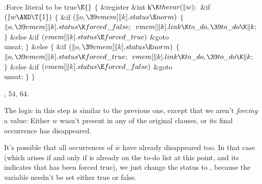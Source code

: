 \Y\B\4:Force literal  to be true\X${}\E{}$\6
${}\{{}$\1\6
\&{register} \&{int} \|k${}\K\\{thevar}(\|w);{}$\7
\&{if} ${}(\|w\AND\T{1}){}$\5
${}\{{}$\1\6
\&{if} ${}(\|o,\39\\{vmem}[\|k].\\{status}\E\\{norm}){}$\5
${}\{{}$\1\6
${}\|o,\39\\{vmem}[\|k].\\{status}\K\\{forced\_false};{}$\6
${}\\{vmem}[\|k].\\{link}\K\\{to\_do},\39\\{to\_do}\K\|k;{}$\6
\4${}\}{}$\5
\2\&{else} \&{if} ${}(\\{vmem}[\|k].\\{status}\E\\{forced\_true}){}$\1\5
\&{goto} \\{unsat};\2\6
\4${}\}{}$\5
\2\&{else}\5
${}\{{}$\1\6
\&{if} ${}(\|o,\39\\{vmem}[\|k].\\{status}\E\\{norm}){}$\5
${}\{{}$\1\6
${}\|o,\39\\{vmem}[\|k].\\{status}\K\\{forced\_true};{}$\6
${}\\{vmem}[\|k].\\{link}\K\\{to\_do},\39\\{to\_do}\K\|k;{}$\6
\4${}\}{}$\5
\2\&{else} \&{if} ${}(\\{vmem}[\|k].\\{status}\E\\{forced\_false}){}$\1\5
\&{goto} \\{unsat};\2\6
\4${}\}{}$\2\6
\4${}\}{}$\2\par
{}, 54, 64.\fi

The logic in this step is similar to the previous one,
except that we aren't {\it forcing\/} a value: Either
$w$ wasn't present in any of the original clauses, or
its final occurrence has disappeared.

It's possible that all occurrences of $\bar w$ have already disappeared too.
In that case (which arises if and only if  is already
on the to-do list at this point, and its  indicates that 
has been forced true), we just change
the status to , because the variable needn't be set either
true or false.

